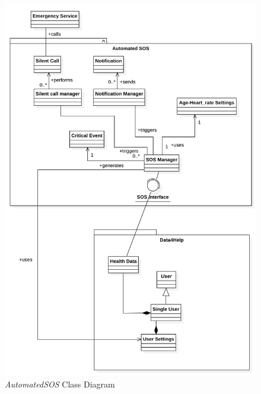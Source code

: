 \documentclass[titlepage]{article}
\begin{document}
		\begin{figure}[H]
			\center
  			\includegraphics[width=\textwidth]{Diagrammi/SOSClass.png}
  			\caption{{\it AutomatedSOS} Class Diagram}
 			\label{fig:SOSClass}
		\end{figure}
\end{document}
